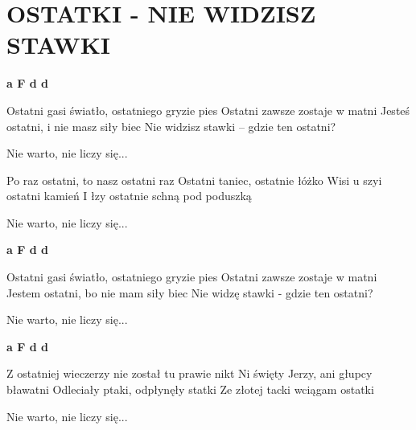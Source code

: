 \documentclass[../../../songbook.tex]{subfiles}
\begin{document}
\TabPositions{8cm} %
\section*{OSTATKI - NIE WIDZISZ STAWKI}
{}
\vspace{0.5cm}
{\color{red}\textbf{a F d d} } \newline

Ostatni gasi światło, ostatniego gryzie pies	 \newline
Ostatni zawsze zostaje w matni \newline
Jesteś ostatni, i nie masz siły biec  \newline
Nie widzisz stawki – gdzie ten ostatni?  \newline

\-\hspace{1cm} Nie warto, nie liczy się... 		 \newline

Po raz ostatni, to nasz ostatni raz \newline
Ostatni taniec, ostatnie łóżko \newline
Wisi u szyi ostatni kamień \newline
I łzy ostatnie schną pod poduszką \newline

\-\hspace{1cm} Nie warto, nie liczy się... \newline

{\color{red}\textbf{a F d d} } \newline

Ostatni gasi światło, ostatniego gryzie pies \newline
Ostatni zawsze zostaje w matni \newline
Jestem ostatni, bo nie mam siły biec \newline
Nie widzę stawki - gdzie ten ostatni?  \newline

\-\hspace{1cm} Nie warto, nie liczy się... \newline

{\color{red}\textbf{a F d d} } \newline

Z ostatniej wieczerzy nie został tu prawie nikt \newline
Ni święty Jerzy, ani głupcy bławatni \newline
Odleciały ptaki, odpłynęły statki \newline
Ze złotej tacki wciągam ostatki \newline

\-\hspace{1cm} Nie warto, nie liczy się... \newline
\end{document}
